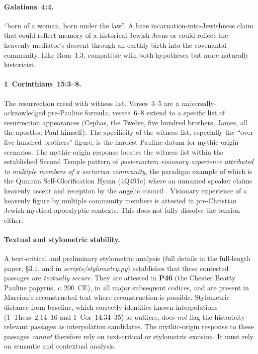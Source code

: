 \documentclass[12pt,oneside]{article}
\newcommand{\circa}{\textit{c.}\,}
\begin{document}
\paragraph{Galatians~4:4.}
\enquote{born of a woman, born under the law}.  A bare
incarnation-into-Jewishness claim that could reflect memory of a
historical Jewish Jesus or could reflect the heavenly mediator's
descent through an earthly birth into the covenantal community.
Like Rom~1:3, compatible with both hypotheses but more naturally
historicist.

\paragraph{1~Corinthians~15:3--8.}
The resurrection creed with witness list.  Verses~3--5 are a
universally-acknowledged pre-Pauline formula; verses~6--8 extend to
a specific list of resurrection appearances (Cephas, the Twelve,
five hundred brothers, James, all the apostles, Paul himself).
The specificity of the witness list, especially the \enquote{over
five hundred brothers} figure, is the hardest Pauline datum for
mythic-origin scenarios.  The mythic-origin response locates the
witness list within the established Second Temple pattern of
\textit{post-mortem visionary experience attributed to multiple
members of a sectarian community}, the paradigm example of which
is the Qumran Self-Glorification Hymn (4Q491c) where an unnamed
speaker claims heavenly ascent and reception by the angelic council
\citep{Collins1995,Knohl2000}.  Visionary experience of a heavenly
figure by multiple community members is attested in pre-Christian
Jewish mystical-apocalyptic contexts.  This does not fully
dissolve the tension either.

\paragraph{Textual and stylometric stability.}
A text-critical and preliminary stylometric analysis (full details
in the full-length paper, §3.1, and in
\textit{scripts/stylometry.py}) establishes that these contested
passages are \textit{textually secure}.  They are attested in
\textbf{P46} (the Chester Beatty Pauline papyrus, \circa 200~CE),
in all major subsequent codices, and are present in Marcion's
reconstructed text where reconstruction is possible.  Stylometric
distance-from-baseline, which correctly identifies known
interpolations (1~Thess~2:14--16 and 1~Cor~14:34--35) as outliers,
does \textit{not} flag the historicity-relevant passages as
interpolation candidates.  The mythic-origin response to these
passages \textit{cannot} therefore rely on text-critical or
stylometric excision.  It must rely on semantic and contextual
analysis.
\end{document}

